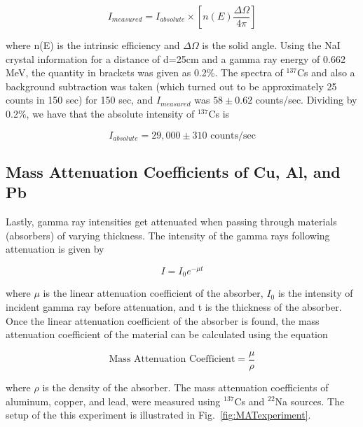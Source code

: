 \documentclass[%
 aip,
rsi,%
 amsmath,amssymb,
 reprint,%
author-numerical,%
]{revtex4-1}
\begin{document}
\begin{equation}
I_{measured}=I_{absolute}\times [n(E) \frac{\Delta \Omega}{4\pi}]
 \label{eq:thirteen}
\end{equation}

\noindent where n(E) is the intrinsic efficiency and $\Delta \Omega$ is the solid angle. Using the NaI crystal information for a distance of d=25cm and a gamma ray energy of 0.662 MeV, the quantity in brackets was given as 0.2$\%$. \newline
\indent The spectra of $^ { 137 }$Cs and also a background subtraction was taken (which turned out to be approximately 25 counts in 150 sec) for 150 sec, and $I_{measured}$ was $58\pm0.62$ counts/sec. Dividing by 0.2$\%$, we have that the absolute intensity of $^ { 137 }$Cs is 

\begin{equation}
I_{absolute}= 29,000\pm310 \text{ counts/sec}
 \label{eq:fourteen}
\end{equation}


\subsection{Mass Attenuation Coefficients of Cu, Al, and Pb}
Lastly, gamma ray intensities get attenuated when passing through materials (absorbers) of varying thickness. The intensity of the gamma rays following attenuation is given by

\begin{equation}
I= I_{0} e^{-\mu t}
 \label{eq:fifteen}
\end{equation}

\noindent where $\mu$ is the linear attenuation coefficient of the absorber, $I_{0}$ is the intensity of incident gamma ray before attenuation, and t is the thickness of the absorber. \newline
\indent Once the linear attenuation coefficient of the absorber is found, the mass attenuation coefficient of the material can be calculated using the equation 

\begin{equation}
\text{Mass Attenuation Coefficient}= \frac{\mu}{\rho}
 \label{eq:sixteen}
\end{equation}

\noindent where $\rho$ is the density of the absorber. \newline
\indent The mass attenuation coefficients of aluminum, copper, and lead, were measured using $^ {137 }$Cs and $^ { 22 }$Na sources. The setup of the this experiment is illustrated in Fig.~\ref{fig:MATexperiment}.
\end{document}
